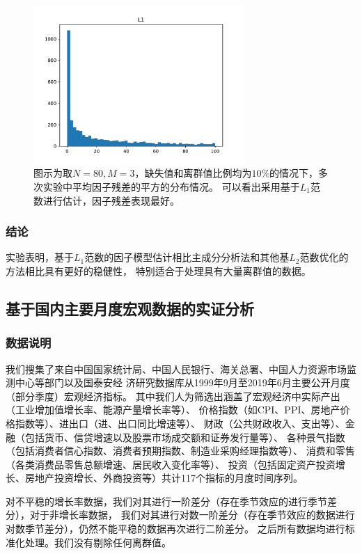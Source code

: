 \begin{figure}[H]
\begin{minipage}[t]{0.48\textwidth}
    \includegraphics[width=8cm]{pics/lab1/l1-ab.pdf}
    \end{minipage}
    \caption{\small 图示为取$N = 80, M=3$，缺失值和离群值比例均为$10\%$的情况下，多次实验中平均因子残差的平方的分布情况。
    可以看出采用基于$L_1$范数进行估计，因子残差表现最好。}
\end{figure}

\subsubsection{结论}
实验表明，基于$L_1$范数的因子模型估计相比主成分分析法和其他基$L_2$范数优化的方法相比具有更好的稳健性，
特别适合于处理具有大量离群值的数据。

\subsection{基于国内主要月度宏观数据的实证分析}

\subsubsection{数据说明}
我们搜集了来自中国国家统计局、中国人民银行、海关总署、中国人力资源市场监测中心等部门以及国泰安经
济研究数据库从1999年9月至2019年6月主要公开月度（部分季度）宏观经济指标。
其中我们人为筛选出涵盖了宏观经济中实际产出（工业增加值增长率、能源产量增长率等）、
价格指数（如CPI、PPI、房地产价格指数等）、进出口（进、出口同比增速等）、
财政（公共财政收入、支出等）、金融（包括货币、信贷增速以及股票市场成交额和证券发行量等）、
各种景气指数（包括消费者信心指数、消费者预期指数、制造业采购经理指数等）、
消费和零售（各类消费品零售总额增速、居民收入变化率等）、
投资（包括固定资产投资增长、房地产投资增长、外商投资等）共计117个指标的月度时间序列。

对不平稳的增长率数据，我们对其进行一阶差分（存在季节效应的进行季节差分），对于非增长率数据，
我们对其进行对数一阶差分（存在季节效应的数据进行对数季节差分），仍然不能平稳的数据再次进行二阶差分。
之后所有数据均进行标准化处理。我们没有剔除任何离群值。

